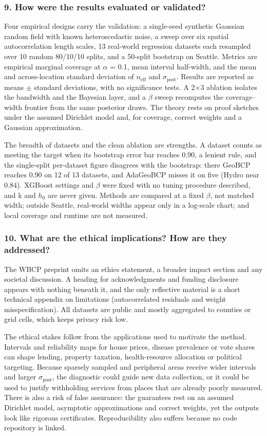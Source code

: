\documentclass[11pt]{article}
\newcommand{\question}[1]{\subsubsection*{#1}}
\begin{document}
\question{9. How were the results evaluated or validated?}

Four empirical designs carry the validation: a single-seed synthetic Gaussian random field with known heteroscedastic noise, a sweep over six spatial autocorrelation length scales, 13 real-world regression datasets each resampled over 10 random 80/10/10 splits, and a 50-split bootstrap on Seattle. Metrics are empirical marginal coverage at \ensuremath{\alpha} = 0.1, mean interval half-width, and the mean and across-location standard deviation of $n_{\mathrm{eff}}$ and $\sigma_{\mathrm{post}}$. Results are reported as means \ensuremath{\pm} standard deviations, with no significance tests. A 2\ensuremath{\times}3 ablation isolates the bandwidth and the Bayesian layer, and a \ensuremath{\beta} sweep recomputes the coverage--width frontier from the same posterior draws. The theory rests on proof sketches under the assumed Dirichlet model and, for coverage, correct weights and a Gaussian approximation.

The breadth of datasets and the clean ablation are strengths. A dataset counts as meeting the target when its bootstrap error bar reaches 0.90, a lenient rule, and the single-split per-dataset figure disagrees with the bootstrap: there GeoBCP reaches 0.90 on 12 of 13 datasets, and AdaGeoBCP misses it on five (Hydro near 0.84). XGBoost settings and \ensuremath{\beta} were fixed with no tuning procedure described, and k and $h_{0}$ are never given. Methods are compared at a fixed \ensuremath{\beta}, not matched width; outside Seattle, real-world widths appear only in a log-scale chart; and local coverage and runtime are not measured.

\question{10. What are the ethical implications? How are they addressed?}

The WBCP preprint omits an ethics statement, a broader impact section and any societal discussion. A heading for acknowledgments and funding disclosure appears with nothing beneath it, and the only reflective material is a short technical appendix on limitations (autocorrelated residuals and weight misspecification). All datasets are public and mostly aggregated to counties or grid cells, which keeps privacy risk low.

The ethical stakes follow from the applications used to motivate the method. Intervals and reliability maps for house prices, disease prevalence or vote shares can shape lending, property taxation, health-resource allocation or political targeting. Because sparsely sampled and peripheral areas receive wider intervals and larger $\sigma_{\mathrm{post}}$, the diagnostic could guide new data collection, or it could be used to justify withholding services from places that are already poorly measured. There is also a risk of false assurance: the guarantees rest on an assumed Dirichlet model, asymptotic approximations and correct weights, yet the outputs look like rigorous certificates. Reproducibility also suffers because no code repository is linked.
\end{document}
